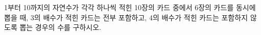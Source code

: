\hspace*{2mm}\begin{minipage}[t]{\dimexpr\linewidth-2mm\relax}\vspace{0pt}
1부터 10까지의 자연수가 각각 하나씩 적힌 10장의 카드 중에서 6장의 카드를 동시에 뽑을 때, 3의 배수가 적힌 카드는 전부 포함하고, 4의 배수가 적힌 카드는 포함하지 않도록 뽑는 경우의 수를 구하시오.\end{minipage}
